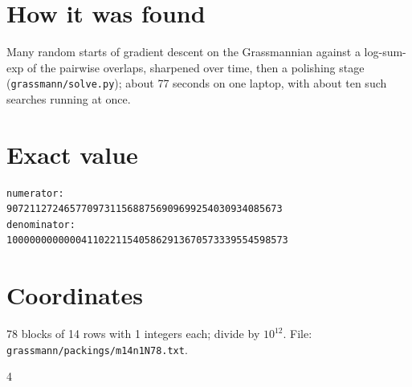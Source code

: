 \documentclass[11pt,a4paper]{article}
\begin{document}
\section{How it was found}
Many random starts of gradient descent on the Grassmannian against a log-sum-exp of the pairwise overlaps, sharpened over time, then a polishing stage (\texttt{grassmann/solve.py}); about 77 seconds on one laptop, with about ten such searches running at once.


\appendix
\section{Exact value}
{\small
\begin{verbatim}
numerator:
907211272465770973115688756909699254030934085673
denominator:
1000000000000411022115405862913670573339554598573
\end{verbatim}}

\section{Coordinates}
78 blocks of 14 rows with 1 integers each; divide by $10^{12}$. File: \texttt{grassmann/packings/m14n1N78.txt}.
{\tiny
\begin{multicols}{4}
\end{multicols}}
\end{document}
